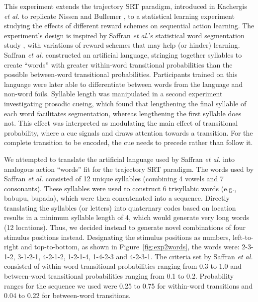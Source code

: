\documentclass[conference]{IEEEtran}
\begin{document}
This experiment extends the trajectory SRT paradigm, introduced in Kachergis \textit{et al.} \cite{Kachergis:2014} to replicate Nissen and Bullemer \cite{Nissen:1987}, to a statistical learning experiment studying the effects of different reward schemes on sequential action learning. The experiment's design is inspired by Saffran \textit{et al.}'s statistical word segmentation study \cite{Saffran:1996}, with variations of reward schemes that may help (or hinder) learning. Saffran \textit{et al.} constructed an artificial language, stringing together syllables to create ``words'' with greater within-word transitional probabilities than the possible between-word transitional probabilities. Participants trained on this language were later able to differentiate between words from the language and non-word foils. Syllable length was manipulated in a second experiment investigating prosodic cueing, which found that lengthening the final syllable of each word facilitates segmentation, whereas lengthening the first syllable does not. This effect was interpreted as modulating the main effect of transitional probability, where a cue signals and draws attention towards a transition. For the complete transition to be encoded, the cue needs to precede rather than follow it.

We attempted to translate the artificial language used by Saffran \textit{et al.} \cite{Saffran:1996} into analogous action ``words'' fit for the trajectory SRT paradigm. The words used by Saffran \textit{et al.} consisted of 12 unique syllables (combining 4 vowels and 7 consonants). These syllables were used to construct 6 trisyllabic words (e.g., babupu, bupada), which were then concatenated into a sequence. Directly translating the syllables (or letters) into quaternary codes based on location results in a minimum syllable length of 4, which would generate very long words (12 locations). Thus, we decided instead to generate novel combinations of four stimulus positions instead. Designating the stimulus positions as numbers, left-to-right and top-to-bottom, as shown in Figure~\ref{fig:exp2words}, the words were: 2-3-1-2, 3-1-2-1, 4-2-1-2, 1-2-1-4, 1-4-2-3 and 4-2-3-1. The criteria set by Saffran \textit{et al.} consisted of within-word transitional probabilities ranging from 0.3 to 1.0 and between-word transitional probabilities ranging from 0.1 to 0.2. Probability ranges for the sequence we used were 0.25 to 0.75 for within-word transitions and 0.04 to 0.22 for between-word transitions.
\end{document}
